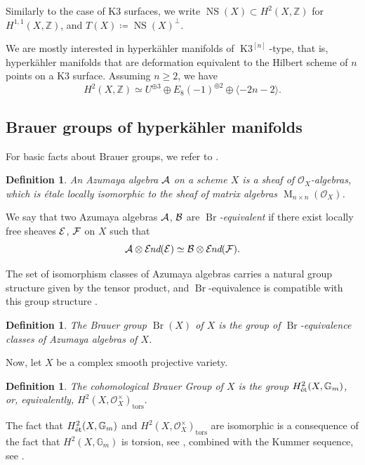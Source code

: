 \documentclass[11pt,twoside]{amsart}
\numberwithin{equation}{section}
\newtheorem{definition}[dummy]{Definition}
\theoremstyle{definition}
\theoremstyle{plain}
\newcommand{\Z}{\ensuremath{\mathbb{Z}}}
\newcommand{\bigo}{\ensuremath{\mathcal{O}}}
\def\NS{\operatorname{NS}}
\def\Br{\operatorname{Br}}
\def\Kn{{\ensuremath{\operatorname{K3}^{[n]}}}}
\begin{document}
Similarly to the case of K3 surfaces, we write $\NS(X)\subset H^2(X,\Z)$ for $H^{1,1}(X,\Z)$, and $T(X)\coloneqq \NS(X)^\perp$.

We are mostly interested in hyperk\"ahler manifolds of \Kn-type, that is, hyperk\"ahler manifolds that are deformation equivalent to the Hilbert scheme of $n$ points on a K3 surface. Assuming $n\geq 2$, we have $$H^2(X,\Z)\simeq U^{\oplus 3}\oplus E_8(-1)^{\oplus 2}\oplus \langle-2n-2\rangle.$$


\subsection{Brauer groups of hyperk\"ahler manifolds}
For basic facts about Brauer groups, we refer to \cite{CS21}.
\begin{definition}
    An Azumaya algebra $\mathcal{A}$ on a scheme $X$ is a sheaf of $\bigo_X$-algebras, which is \'etale locally isomorphic to the sheaf of matrix algebras $\operatorname{M}_{n\times n}(\bigo_X)$. 
\end{definition}

We say that two Azumaya algebras $\mathcal{A}$, $\mathcal{B}$ are \textit{$\Br$-equivalent} if there exist locally free sheaves $\mathcal{E}$, $\mathcal{F}$ on $X$ such that 
\begin{equation}\label{eq:brequiv}\mathcal{A}\otimes \operatorname{\mathcal{E\kern -1pt}\textit{nd}}(\mathcal{E})\simeq \mathcal{B}\otimes \operatorname{\mathcal{E\kern -1pt}\textit{nd}}(\mathcal{F}).
\end{equation}

The set of isomorphism classes of Azumaya algebras carries a natural group structure given by the tensor product, and $\Br$-equivalence is compatible with this group structure \cite[Theorem 5.1]{Gro68}.

\begin{definition}
    The Brauer group $\Br(X)$ of $X$ is the group of $\Br$-equivalence classes of Azumaya algebras of $X$.
\end{definition}

Now, let $X$ be a complex smooth projective variety.

\begin{definition}
    The \textit{cohomological Brauer Group} of $X$ is the group $H^2_{\operatorname{\acute{e}t}}(X,\mathbb{G}_m)$, or, equivalently, $H^2(X,\bigo_X^\times)_{\text{tors}}.$ 
\end{definition}
The fact that $H^2_{\operatorname{\acute{e}t}}(X,\mathbb{G}_m)$ and $H^2(X,\bigo_X^\times)_{\text{tors}}$ are isomorphic is a consequence of the fact that $H^2(X,\mathbb{G}_m)$ is torsion, see \cite[Remark 18.1.4ii)]{Huy16}, combined with the Kummer sequence, see \cite[Remark 11.5.13]{Huy16}.
\end{document}
